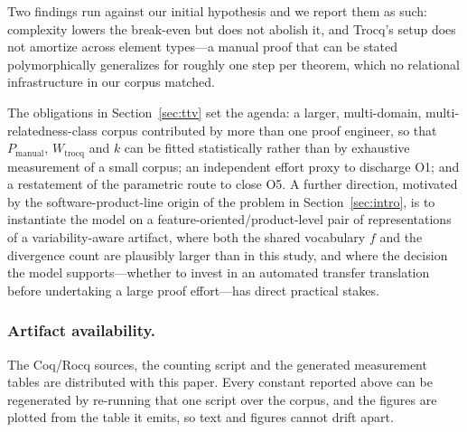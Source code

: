 \documentclass[runningheads]{llncs}
\begin{document}
Two findings run against our initial hypothesis and we report them as such:
complexity lowers the break-even but does not abolish it, and Trocq's setup
does not amortize across element types---a manual proof that can be stated
polymorphically generalizes for roughly one step per theorem, which no
relational infrastructure in our corpus matched.

The obligations in Section~\ref{sec:ttv} set the agenda: a larger,
multi-domain, multi-relatedness-class corpus contributed by more than one
proof engineer, so that $P_{\text{manual}}$, $W_{\text{trocq}}$ and $k$ can be
fitted statistically rather than by exhaustive measurement of a small corpus;
an independent effort proxy to discharge O1; and a restatement of the
parametric route to close O5. A further direction, motivated by the
software-product-line origin of the problem in
Section~\ref{sec:intro}, is to instantiate the model on a
feature-oriented/product-level pair of representations of a variability-aware
artifact, where both the shared vocabulary $f$ and the divergence count are
plausibly larger than in this study, and where the decision the model
supports---whether to invest in an automated transfer translation before
undertaking a large proof effort---has direct practical stakes.

\subsubsection*{Artifact availability.}
The Coq/Rocq sources, the counting script and the generated measurement
tables are distributed with this paper. Every constant reported above can be
regenerated by re-running that one script over the corpus, and the figures
are plotted from the table it emits, so text and figures cannot drift apart.



\end{document}
